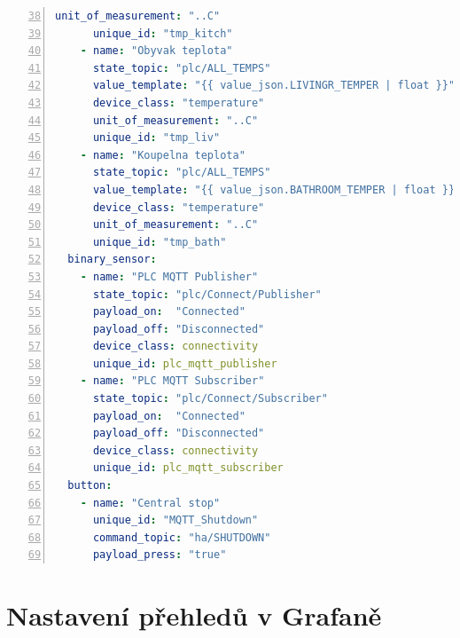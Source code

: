 \begin{lstlisting}[language=YAML, breaklines=true, numbers=left, firstnumber=38, numberstyle=\small, numbersep=10pt, frame=single, basicstyle=\ttfamily\small]
      unit_of_measurement: "..C"                                
      unique_id: "tmp_kitch"                                   
    - name: "Obyvak teplota"                                   
      state_topic: "plc/ALL_TEMPS"                             
      value_template: "{{ value_json.LIVINGR_TEMPER | float }}" 
      device_class: "temperature"                               
      unit_of_measurement: "..C"                               
      unique_id: "tmp_liv"                                     
    - name: "Koupelna teplota"                                 
      state_topic: "plc/ALL_TEMPS"                             
      value_template: "{{ value_json.BATHROOM_TEMPER | float }}"
      device_class: "temperature"                              
      unit_of_measurement: "..C"                               
      unique_id: "tmp_bath"
  binary_sensor:           
    - name: "PLC MQTT Publisher"              
      state_topic: "plc/Connect/Publisher"         
      payload_on:  "Connected"                                 
      payload_off: "Disconnected"   
      device_class: connectivity
      unique_id: plc_mqtt_publisher
    - name: "PLC MQTT Subscriber"
      state_topic: "plc/Connect/Subscriber"                    
      payload_on:  "Connected"                                 
      payload_off: "Disconnected"
      device_class: connectivity
      unique_id: plc_mqtt_subscriber
  button:                                                      
    - name: "Central stop"                                     
      unique_id: "MQTT_Shutdown"                                
      command_topic: "ha/SHUTDOWN"                              
      payload_press: "true" 
\end{lstlisting}
\chapter{Nastavení přehledů v Grafaně}
\label{apend:grafana}
